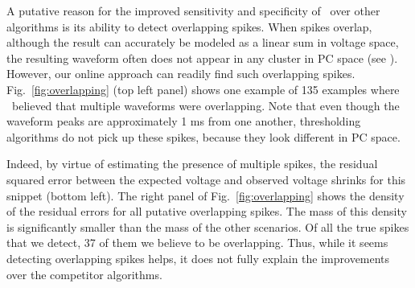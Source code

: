 A putative reason for the improved sensitivity and specificity of \smug\ over other algorithms is its ability to detect overlapping spikes.   When spikes overlap, although the result can accurately be modeled as a linear sum in voltage space, the resulting waveform often does not appear in any cluster in PC space (see \cite{Pillow2013}).  However, our online approach can readily find such overlapping spikes.  Fig.\ \ref{fig:overlapping} (top left panel) shows one example of 135 examples where \smug\ believed that multiple waveforms were overlapping.
Note that even though the waveform peaks are approximately 1 ms from one another, thresholding algorithms do not pick up these spikes, because they look different in PC space. 

Indeed, by virtue of estimating the presence of multiple spikes, the residual squared error between the expected voltage and observed voltage shrinks for this snippet (bottom left).  The right panel of Fig.\ \ref{fig:overlapping} shows the density of the residual errors for all putative overlapping spikes.  The mass of this density is significantly smaller than the mass of the other scenarios.  Of all the true spikes that we detect, 37 of them we believe to be overlapping.  Thus, while it seems detecting overlapping spikes helps, it does not fully explain the improvements over the competitor algorithms.




